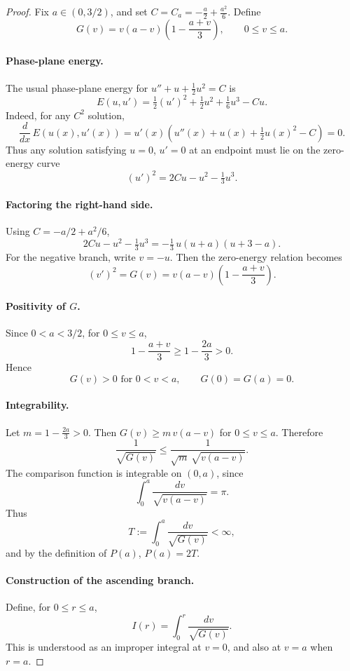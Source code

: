\documentclass{article}
\begin{document}
\begin{proof}
Fix $a \in (0, 3/2)$, and set $C = C_a = -\frac{a}{2} + \frac{a^2}{6}$. Define
\[
G(v) = v(a-v)\!\left(1 - \frac{a+v}{3}\right), \qquad 0 \le v \le a.
\]

\paragraph{Phase-plane energy.}
The usual phase-plane energy for $u'' + u + \frac{1}{2}u^2 = C$ is
\[
E(u,u') = \tfrac{1}{2}(u')^2 + \tfrac{1}{2}u^2 + \tfrac{1}{6}u^3 - Cu.
\]
Indeed, for any $C^2$ solution,
\[
\frac{d}{dx}\,E(u(x),u'(x)) = u'(x)\!\left(u''(x) + u(x) + \tfrac{1}{2}u(x)^2 - C\right) = 0.
\]
Thus any solution satisfying $u = 0$, $u' = 0$ at an endpoint must lie on the zero-energy curve
\[
(u')^2 = 2Cu - u^2 - \tfrac{1}{3}u^3.
\]

\paragraph{Factoring the right-hand side.}
Using $C = -a/2 + a^2/6$,
\[
2Cu - u^2 - \tfrac{1}{3}u^3 = -\tfrac{1}{3}\,u(u+a)(u+3-a).
\]
For the negative branch, write $v = -u$. Then the zero-energy relation becomes
\[
(v')^2 = G(v) = v(a-v)\!\left(1 - \frac{a+v}{3}\right).
\]

\paragraph{Positivity of $G$.}
Since $0 < a < 3/2$, for $0 \le v \le a$,
\[
1 - \frac{a+v}{3} \ge 1 - \frac{2a}{3} > 0.
\]
Hence
\[
G(v) > 0 \text{ for } 0 < v < a, \qquad G(0) = G(a) = 0.
\]

\paragraph{Integrability.}
Let $m = 1 - \frac{2a}{3} > 0$. Then $G(v) \ge m\,v(a-v)$ for $0 \le v \le a$. Therefore
\[
\frac{1}{\sqrt{G(v)}} \le \frac{1}{\sqrt{m}\,\sqrt{v(a-v)}}.
\]
The comparison function is integrable on $(0,a)$, since
\[
\int_0^a \frac{dv}{\sqrt{v(a-v)}} = \pi.
\]
Thus
\[
T := \int_0^a \frac{dv}{\sqrt{G(v)}} < \infty,
\]
and by the definition of $P(a)$, $P(a) = 2T$.

\paragraph{Construction of the ascending branch.}
Define, for $0 \le r \le a$,
\[
I(r) = \int_0^r \frac{dv}{\sqrt{G(v)}}.
\]
This is understood as an improper integral at $v = 0$, and also at $v = a$ when $r = a$.


\end{proof}
\end{document}
